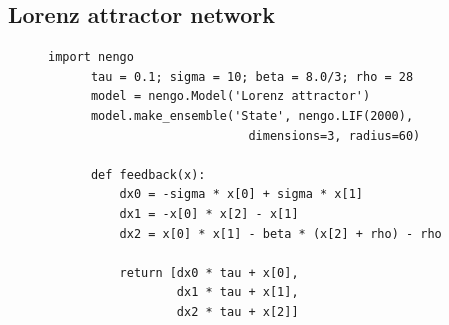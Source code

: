 \documentclass{frontiersSCNS}
\begin{document}
\subsection{Lorenz attractor network} \label{sec:lorenz}

\begin{figure}
\begin{center}
  \begin{minipage}{0.43\textwidth}
    \begin{lstlisting}[basicstyle={\footnotesize\ttfamily}]
      import nengo
      tau = 0.1; sigma = 10; beta = 8.0/3; rho = 28
      model = nengo.Model('Lorenz attractor')
      model.make_ensemble('State', nengo.LIF(2000),
                            dimensions=3, radius=60)

      def feedback(x):
          dx0 = -sigma * x[0] + sigma * x[1]
          dx1 = -x[0] * x[2] - x[1]
          dx2 = x[0] * x[1] - beta * (x[2] + rho) - rho

          return [dx0 * tau + x[0],
                  dx1 * tau + x[1],
                  dx2 * tau + x[2]]


\end{lstlisting}
\end{minipage}
\end{center}
\end{figure}
\end{document}
